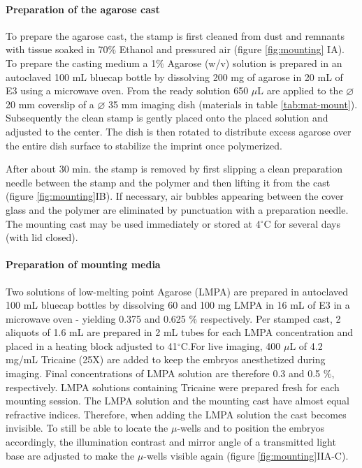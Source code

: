 \documentclass[10pt, b5paper, singlespacinge, twoside]{reedthesis} %
\theoremstyle{definition}
\theoremstyle{definition}
\theoremstyle{definition}
\theoremstyle{remark}
\begin{document}
\hypertarget{preparation-of-the-agarose-cast}{%
\paragraph{Preparation of the agarose cast}\label{preparation-of-the-agarose-cast}}

To prepare the agarose cast, the stamp is first cleaned from dust and remnants with tissue soaked in 70\(\%\) Ethanol and pressured air (figure \ref{fig:mounting} IA). To prepare the casting medium a 1\(\%\) Agarose (w/v) solution is prepared in an autoclaved 100 mL bluecap bottle by dissolving 200 mg of agarose in 20 mL of E3 using a microwave oven. From the ready solution 650 \(\mu\)L are applied to the \(\varnothing\) 20 mm coverslip of a \(\varnothing\) 35 mm imaging dish (materials in table \ref{tab:mat-mount}). Subsequently the clean stamp is gently placed onto the placed solution and adjusted to the center. The dish is then rotated to distribute excess agarose over the entire dish surface to stabilize the imprint once polymerized.

After about 30 min. the stamp is removed by first slipping a clean preparation needle between the stamp and the polymer and then lifting it from the cast (figure \ref{fig:mounting}IB). If necessary, air bubbles appearing between the cover glass and the polymer are eliminated by punctuation with a preparation needle. The mounting cast may be used immediately or stored at 4\(^\circ\)C for several days (with lid closed).

\hypertarget{preparation-of-mounting-media}{%
\paragraph{Preparation of mounting media}\label{preparation-of-mounting-media}}

Two solutions of low-melting point Agarose (LMPA) are prepared in autoclaved 100 mL bluecap bottles by dissolving 60 and 100 mg LMPA in 16 mL of E3 in a microwave oven - yielding 0.375 and 0.625 \(\%\) respectively. Per stamped cast, 2 aliquots of 1.6 mL are prepared in 2 mL tubes for each LMPA concentration and placed in a heating block adjusted to 41\(^\circ\)C.For live imaging, 400 \(\mu\)L of 4.2 mg/mL Tricaine (25X) are added to keep the embryos anesthetized during imaging. Final concentrations of LMPA solution are therefore 0.3 and 0.5 \(\%\), respectively. LMPA solutions containing Tricaine were prepared fresh for each mounting session. The LMPA solution and the mounting cast have almost equal refractive indices. Therefore, when adding the LMPA solution the cast becomes invisible. To still be able to locate the \(\mu\)-wells and to position the embryos accordingly, the illumination contrast and mirror angle of a transmitted light base are adjusted to make the \(\mu\)-wells visible again (figure \ref{fig:mounting}IIA-C).
\end{document}
